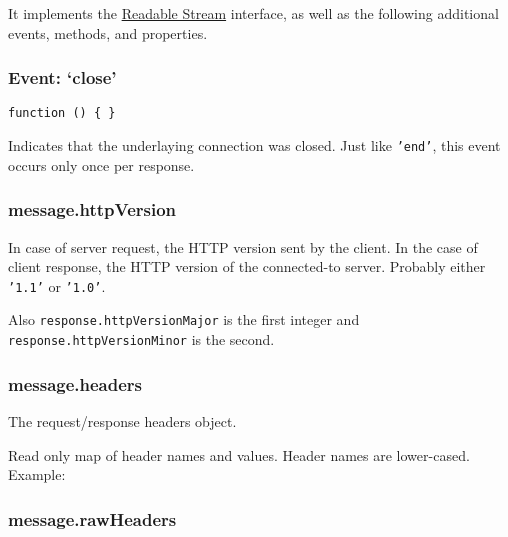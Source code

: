 It implements the
\href{stream.html\#stream_class_stream_readable}{Readable Stream}
interface, as well as the following additional events, methods, and
properties.

\subsubsection{Event: `close'}\label{event-close-2}

\texttt{function () \{ \}}

Indicates that the underlaying connection was closed. Just like
\texttt{'end'}, this event occurs only once per response.

\subsubsection{message.httpVersion}\label{message.httpversion}

In case of server request, the HTTP version sent by the client. In the
case of client response, the HTTP version of the connected-to server.
Probably either \texttt{'1.1'} or \texttt{'1.0'}.

Also \texttt{response.httpVersionMajor} is the first integer and
\texttt{response.httpVersionMinor} is the second.

\subsubsection{message.headers}\label{message.headers}

The request/response headers object.

Read only map of header names and values. Header names are lower-cased.
Example:

\begin{Shaded}
\begin{Highlighting}[]
\CommentTok{//}
\NormalTok{(}\NormalTok{);}
\end{Highlighting}
\end{Shaded}

\subsubsection{message.rawHeaders}\label{message.rawheaders}

